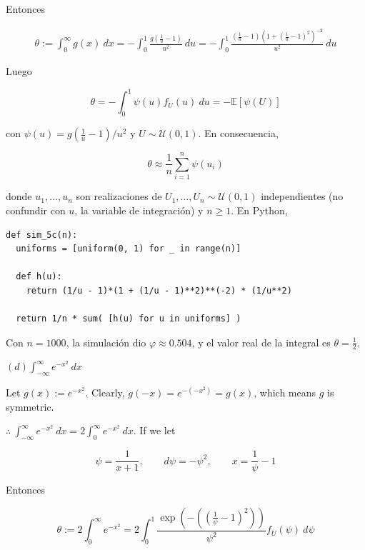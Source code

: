 \documentclass[a4paper, 12pt]{article}
\begin{document}
Entonces 

\begin{align*}
  \theta := \int_0^\infty g(x) ~ dx = -\int_0^1 \frac{g(\frac{1}{u} - 1)}{u^2}
  ~ du = -\int_0^1 \frac{(\frac{1}{u} - 1)(1 + (\frac{1}{u} - 1)^2)^{-2}}{u^2} ~
  du
\end{align*}

Luego 

\begin{equation*}
  \theta = -\int_0^1 \psi(u) f_U(u) ~ du = -\mathbb{E}\left[ \psi(U) \right] 
\end{equation*}

con $\psi(u) = g(\frac{1}{u} - 1) / u^2$ y $U \sim \mathcal{U}(0, 1)$. En
consecuencia, 

\begin{equation*}
  \theta \approx \frac{1}{n}\sum_{i=1}^n \psi(u_i)
\end{equation*}

donde $u_1, \ldots, u_n$ son realizaciones de $U_1, \ldots, U_n \sim
\mathcal{U}(0, 1)$ independientes (no confundir con $u$, la variable de
integración) y $n \geq 1$. En Python, 

\begin{verbatim}
def sim_5c(n):
  uniforms = [uniform(0, 1) for _ in range(n)]

  def h(u):
    return (1/u - 1)*(1 + (1/u - 1)**2)**(-2) * (1/u**2)

  return 1/n * sum( [h(u) for u in uniforms] )
\end{verbatim}

Con $n = 1000$, la simulación dio $\varphi \approx 0.504$, y el valor real de la
integral es $\theta = \frac{1}{2}$.

\pagebreak

\begin{myframe}
$(d) \int_{-\infty}^\infty e^{-x^2} ~ dx$
\end{myframe}


Let $g(x) := e^{-x^2}$. Clearly, $g(-x) = e^{-(-x^2)} = g(x)$, which means $g$
is symmetric.

$\therefore ~ \int_{-\infty}^\infty e^{-x^2} ~ dx = 2\int_0^\infty e^{-x^2} ~
dx$. If we let 

\begin{equation*}
  \psi = \frac{1}{x+1}, \qquad d \psi = -\psi^2, \qquad x = \frac{1}{\psi}-1
\end{equation*}

Entonces

\begin{equation*}
  \theta := 2\int_0^\infty e^{-x^2} = 2\int_0^1 \frac{\exp\left(-\left(\left(\frac{1}{\psi} -
  1\right)^2\right)\right)}{\psi^2} f_U(\psi) ~ d\psi
\end{equation*}
\end{document}
